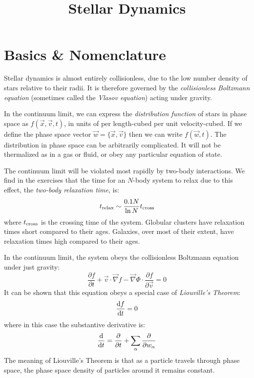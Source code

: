 \title{\bf Stellar Dynamics}

\section{Basics \& Nomenclature}

Stellar dynamics is almost entirely collisionless, due to the low
number density of stars relative to their radii. It is therefore
governed by the {\it collisionless Boltzmann equation} (sometimes
called the {\it Vlasov equation}) acting under gravity.

In the continuum limit, we can express the {\it distribution function}
of stars in phase space as $f(\vec{x}, \vec{v}, t)$, in units of per
length-cubed per unit velocity-cubed. If we define the phase space
vector $\vec{w} = \{\vec{x}, \vec{v}\}$ then we can write $f(\vec{w},
t)$. The distribution in phase space can be arbitrarily
complicated. It will not be thermalized as in a gas or fluid, or obey
any particular equation of state.

The continuum limit will be violated most rapidly by two-body
interactions. We find in the exercises that the time for an $N$-body
system to relax due to this effect, the {\it two-body relaxation
time}, is:
\begin{equation}
\label{eq:relax}
t_{\rm relax} \sim \frac{0.1 N}{\ln N} t_{\rm cross}
\end{equation}
where $t_{\rm cross}$ is the crossing time of the system. Globular
clusters have relaxation times short compared to their ages.
Galaxies, over most of their extent, have relaxation times high
compared to their ages.

In the continuum limit, the system obeys the collisionless Boltzmann
equation under just gravity:
\begin{equation}
 \frac{\partial f}{\partial t} + \vec{v}\cdot\vec{\nabla} f -
\vec{\nabla}\Phi\cdot\frac{\partial f}{\partial \vec{v}} = 0
\end{equation}
It can be shown that this equation obeys a special case of {\it
Liouville's Theorem}:
\begin{equation}
\frac{{\rm d}f}{{\rm d}t} = 0
\end{equation}
where in this case the substantive derivative is:
\begin{equation}
\frac{\rm d}{{\rm d}t} = \frac{\partial}{\partial t}
+ \sum_\alpha \frac{\partial}{\partial w_\alpha}
\end{equation}
The meaning of Liouville's Theorem is that as a particle travels
through phase space, the phase space density of particles around it
remains constant.

